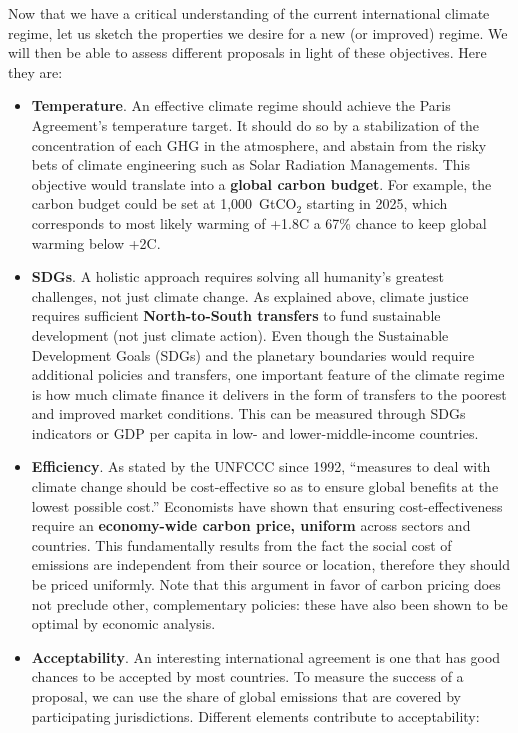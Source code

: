 \documentclass[12pt,english]{article}
\newcommand{\bo}[1]{\textbf{#1}}
\begin{document}
Now that we have a critical understanding of the current international climate regime, let us sketch the properties we desire for a new (or improved) regime. We will then be able to assess different proposals in light of these objectives. Here they are:
\begin{itemize}
  \item \bo{Temperature}. An effective climate regime should achieve the Paris Agreement's temperature target. It should do so by a stabilization of the concentration of each GHG in the atmosphere, and abstain from the risky bets of climate engineering such as Solar Radiation Managements. This objective would translate into a \textbf{global carbon budget}. For example, the carbon budget could be set at 1,000~GtCO$_\text{2}$ starting in 2025, which corresponds to most likely warming of +1.8\textdegree{}C a 67\% chance to keep global warming below +2\textdegree{}C. 
  \item \bo{SDGs}. A holistic approach requires solving all humanity's greatest challenges, not just climate change. As explained above, climate justice requires sufficient \textbf{North-to-South transfers} to fund sustainable development (not just climate action). Even though the Sustainable Development Goals (SDGs) and the planetary boundaries would require additional policies and transfers, one important feature of the climate regime is how much climate finance it delivers in the form of transfers to the poorest and improved market conditions. This can be measured through SDGs indicators or GDP per capita in low- and lower-middle-income countries.
  \item \bo{Efficiency}. As stated by the UNFCCC since 1992,\cite{unfccc_united_1992-1} ``measures to deal with climate change should be cost-effective so as to ensure global benefits at the lowest possible cost.'' Economists have shown that ensuring cost-effectiveness require an \textbf{economy-wide carbon price, uniform} across sectors and countries. This fundamentally results from the fact the social cost of emissions are independent from their source or location, therefore they should be priced uniformly. %
  Note that this argument in favor of carbon pricing does not preclude other, complementary policies: these have also been shown to be optimal by economic analysis.\cite{stiglitz_addressing_2019}
  \item \bo{Acceptability}. An interesting international agreement is one that has good chances to be accepted by most countries. To measure the success of a proposal, we can use the share of global emissions that are covered by participating jurisdictions. Different elements contribute to acceptability: 

\end{itemize}
\end{document}

